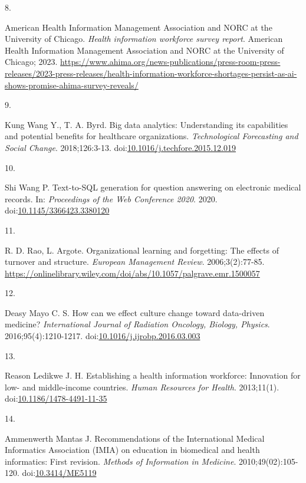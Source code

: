 \documentclass[
  american,
  11pt,
  letterpaper,
  oneside  ,captions=tableheading
]{scrartcl}
\newlength{\cslhangindent}
\newlength{\csllabelwidth}
\newenvironment{CSLReferences}[2] %
 {\begin{list}{}{%
  \setlength{\itemindent}{0pt}
  \setlength{\leftmargin}{0pt}
  \setlength{\parsep}{0pt}
  \ifodd #1
   \setlength{\leftmargin}{\cslhangindent}
   \setlength{\itemindent}{-1\cslhangindent}
  \fi
  \setlength{\itemsep}{#2\baselineskip}}}
 {\end{list}}
\newcommand{\CSLLeftMargin}[1]{\parbox[t]{\csllabelwidth}{\strut#1\strut}}
\newcommand{\CSLRightInline}[1]{\parbox[t]{\linewidth - \csllabelwidth}{\strut#1\strut}}
\begin{document}
\begin{CSLReferences}{0}{1}
\CSLLeftMargin{8. }%
\CSLRightInline{American Health Information Management Association and
NORC at the University of Chicago. \emph{{Health information workforce
survey report}}. {American Health Information Management Association and
NORC at the University of Chicago}; 2023.
\url{https://www.ahima.org/news-publications/press-room-press-releases/2023-press-releases/health-information-workforce-shortages-persist-as-ai-shows-promise-ahima-survey-reveals/}}

\CSLLeftMargin{9. }%
\CSLRightInline{Kung Wang Y., T. A. Byrd. {Big data analytics:
Understanding its capabilities and potential benefits for healthcare
organizations}. \emph{Technological Forecasting and Social Change}.
2018;126:3-13.
doi:\href{https://doi.org/10.1016/j.techfore.2015.12.019}{10.1016/j.techfore.2015.12.019}}

\CSLLeftMargin{10. }%
\CSLRightInline{Shi Wang P. {Text-to-SQL generation for question
answering on electronic medical records}. In: \emph{Proceedings of the
Web Conference 2020}. 2020.
doi:\href{https://doi.org/10.1145/3366423.3380120}{10.1145/3366423.3380120}}

\CSLLeftMargin{11. }%
\CSLRightInline{R. D. Rao, L. Argote. Organizational learning and
forgetting: The effects of turnover and structure. \emph{European
Management Review}. 2006;3(2):77-85.
\url{https://onlinelibrary.wiley.com/doi/abs/10.1057/palgrave.emr.1500057}}

\CSLLeftMargin{12. }%
\CSLRightInline{Deasy Mayo C. S. {How can we effect culture change
toward data-driven medicine?} \emph{International Journal of Radiation
Oncology, Biology, Physics}. 2016;95(4):1210-1217.
doi:\href{https://doi.org/10.1016/j.ijrobp.2016.03.003}{10.1016/j.ijrobp.2016.03.003}}

\CSLLeftMargin{13. }%
\CSLRightInline{Reason Ledikwe J. H. {Establishing a health information
workforce: Innovation for low- and middle-income countries}. \emph{Human
Resources for Health}. 2013;11(1).
doi:\href{https://doi.org/10.1186/1478-4491-11-35}{10.1186/1478-4491-11-35}}

\CSLLeftMargin{14. }%
\CSLRightInline{Ammenwerth Mantas J. {Recommendations of the
International Medical Informatics Association (IMIA) on education in
biomedical and health informatics: First revision}. \emph{Methods of
Information in Medicine}. 2010;49(02):105-120.
doi:\href{https://doi.org/10.3414/ME5119}{10.3414/ME5119}}


\end{CSLReferences}
\end{document}
